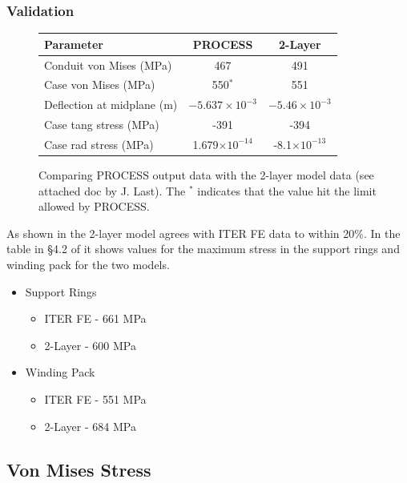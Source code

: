 \documentclass[hidelinks]{article}
\numberwithin{equation}{section}
\begin{document}
    \subsubsection{Validation}

    \begin{figure}[!t]
     \begin{center}
      \begin{tabular}{lcc}
       Parameter & PROCESS & 2-Layer \\
       \toprule
       Conduit von Mises (MPa) & 467 & 491 \\
       Case von Mises (MPa) & 550$^*$ & 551  \\
       Deflection at midplane (m) & $-5.637\times 10^{-3}$ & $-5.46\times 10^{-3}$ \\
       Case tang stress (MPa) & -391 & -394  \\
       Case rad stress (MPa) & 1.679$\times10^{-14}$ & -8.1$\times10^{-13}$ \\
       \bottomrule
      \end{tabular}\vspace{0.5cm}
      \caption{Comparing PROCESS output data with the 2-layer model data (see attached 
      doc by J. Last). The $^*$ indicates that the value hit the limit allowed by PROCESS.}
     \end{center}
    \end{figure}

    As shown in \cite{J.Last2013} the 2-layer model agrees with ITER FE data to 
    within 20\%. In the table in \S 4.2 of \cite{J.Last2013} it shows values for 
    the maximum stress in the support rings and winding pack for the two models.
    \begin{itemize}
        \item Support Rings
        \begin{itemize}
            \item ITER FE - 661 MPa
            \item 2-Layer - 600 MPa
        \end{itemize}
        \item Winding Pack
        \begin{itemize}
            \item ITER FE - 551 MPa
            \item 2-Layer - 684 MPa
        \end{itemize}
    \end{itemize}

    \subsection{Von Mises Stress}
\end{document}
